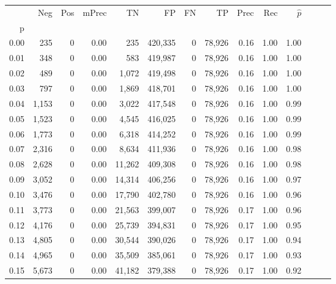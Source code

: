 \begin{tabular}{rrrrrrrrrrrrrr}
\toprule
{} &    Neg &    Pos & mPrec &       TN &       FP &      FN &      TP &  Prec &   Rec & $\hat{p}$ \\
p    &        &        &       &          &          &         &         &       &       &           \\
\midrule
0.00 &    235 &      0 &  0.00 &      235 &  420,335 &       0 &  78,926 &  0.16 &  1.00 &      1.00 \\
0.01 &    348 &      0 &  0.00 &      583 &  419,987 &       0 &  78,926 &  0.16 &  1.00 &      1.00 \\
0.02 &    489 &      0 &  0.00 &    1,072 &  419,498 &       0 &  78,926 &  0.16 &  1.00 &      1.00 \\
0.03 &    797 &      0 &  0.00 &    1,869 &  418,701 &       0 &  78,926 &  0.16 &  1.00 &      1.00 \\
0.04 &  1,153 &      0 &  0.00 &    3,022 &  417,548 &       0 &  78,926 &  0.16 &  1.00 &      0.99 \\
0.05 &  1,523 &      0 &  0.00 &    4,545 &  416,025 &       0 &  78,926 &  0.16 &  1.00 &      0.99 \\
0.06 &  1,773 &      0 &  0.00 &    6,318 &  414,252 &       0 &  78,926 &  0.16 &  1.00 &      0.99 \\
0.07 &  2,316 &      0 &  0.00 &    8,634 &  411,936 &       0 &  78,926 &  0.16 &  1.00 &      0.98 \\
0.08 &  2,628 &      0 &  0.00 &   11,262 &  409,308 &       0 &  78,926 &  0.16 &  1.00 &      0.98 \\
0.09 &  3,052 &      0 &  0.00 &   14,314 &  406,256 &       0 &  78,926 &  0.16 &  1.00 &      0.97 \\
0.10 &  3,476 &      0 &  0.00 &   17,790 &  402,780 &       0 &  78,926 &  0.16 &  1.00 &      0.96 \\
0.11 &  3,773 &      0 &  0.00 &   21,563 &  399,007 &       0 &  78,926 &  0.17 &  1.00 &      0.96 \\
0.12 &  4,176 &      0 &  0.00 &   25,739 &  394,831 &       0 &  78,926 &  0.17 &  1.00 &      0.95 \\
0.13 &  4,805 &      0 &  0.00 &   30,544 &  390,026 &       0 &  78,926 &  0.17 &  1.00 &      0.94 \\
0.14 &  4,965 &      0 &  0.00 &   35,509 &  385,061 &       0 &  78,926 &  0.17 &  1.00 &      0.93 \\
0.15 &  5,673 &      0 &  0.00 &   41,182 &  379,388 &       0 &  78,926 &  0.17 &  1.00 &      0.92 \\

\end{tabular}
